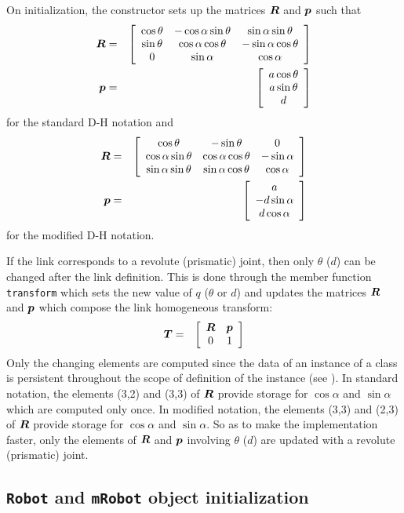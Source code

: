 \documentclass[dvips,11pt,fleqn]{report}
\newcommand{\mbold}[1]{\mbox{\boldmath $ #1 $}}
\newcommand{\matr}[2]{\left[\begin{array}{#1} #2 \end{array}\right]}
\begin{document}
On initialization, the constructor sets up the matrices $\mbold{R}$ and $\mbold{p}$ such that
\begin{eqnarray}
\mbold{R} & = & \matr{ccc}{ 
\cos \theta & -\cos \alpha \sin \theta & \sin \alpha \sin \theta \\
\sin \theta & \cos \alpha \cos \theta & -\sin \alpha \cos \theta \\
0 & \sin \alpha & \cos \alpha } \\
\mbold{p} & = & \matr{c}{a \cos \theta \\ a \sin \theta \\ d}
\end{eqnarray}
for the standard D-H notation and
\begin{eqnarray}
  \mbold{R} & = & \matr{ccc}{ 
    \cos \theta & -\sin \theta & 0 \\
    \cos \alpha \sin \theta & \cos \alpha \cos \theta & -\sin \alpha \\
    \sin \alpha \sin \theta & \sin \alpha \cos \theta & \cos \alpha } \\
  \mbold{p} & = & \matr{c}{a \\ - d \sin \alpha \\ d \cos \alpha }
\end{eqnarray}
for the modified D-H notation.

If the link corresponds to a revolute (prismatic) joint, then
only $\theta$ ($d$) can be changed after the link definition. This is done through 
the member function {\tt transform} which sets the new value of $q$ ($\theta$ or $d$) and
updates the matrices $\mbold{R}$ and $\mbold{p}$ which compose the link homogeneous transform:
\begin{eqnarray}
\mbold{T} & = & \matr{cc}{
\mbold{R} & \mbold{p} \\
0 & 1 }
\end{eqnarray}
Only the changing elements are computed since the data of an instance
of a class is persistent throughout the scope of definition of the
instance (see \cite{eckel}). In standard notation, the elements (3,2)
and (3,3) of $\mbold{R}$ provide storage for $\cos \alpha$ and $\sin
\alpha$ which are computed only once. In modified notation, the
elements (3,3) and (2,3) of $\mbold{R}$ provide storage for $\cos
\alpha$ and $\sin \alpha$. So as to make the implementation faster,
only the elements of $\mbold{R}$ and $\mbold{p}$ involving $\theta$
($d$) are updated with a revolute (prismatic) joint.


\subsection{\texttt{Robot} and \texttt{mRobot} object initialization}
\end{document}
